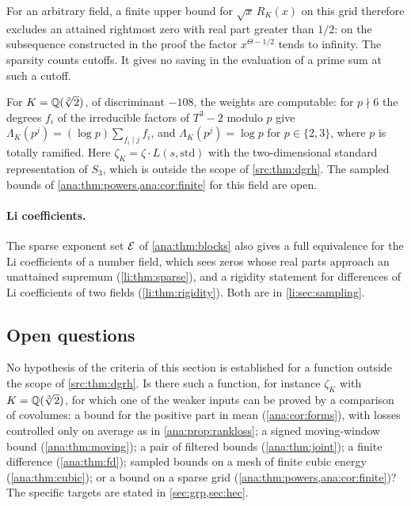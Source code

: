 For an arbitrary field, a finite upper bound for $\sqrt x\,R_K(x)$ on this grid therefore
excludes an attained rightmost zero with real part greater than $1/2$: on the subsequence
constructed in the proof the factor $x^{\Theta-1/2}$ tends to infinity. The sparsity counts
cutoffs. It gives no saving in the evaluation of a prime sum at such a cutoff.

\begin{example}\label{ana:ex:cuberoot}
For $K=\mathbb{Q}(\sqrt[3]{2})$, of discriminant $-108$, the weights are computable: for $p\nmid6$ the
degrees $f_i$ of the irreducible factors of $T^3-2$ modulo $p$ give
$\Lambda_K(p^j)=(\log p)\sum_{f_i\mid j}f_i$, and $\Lambda_K(p^j)=\log p$ for $p\in\{2,3\}$,
where $p$ is totally ramified. Here $\zeta_K=\zeta\cdot L(s,\mathrm{std})$ with the
two-dimensional standard representation of $S_3$, which is outside the scope of
\cref{src:thm:dgrh}. The sampled bounds of \cref{ana:thm:powers,ana:cor:finite} for this field
are open.
\end{example}

\paragraph{Li coefficients.}
The sparse exponent set $\mathcal{E}$ of \cref{ana:thm:blocks} also gives a full equivalence for the
Li coefficients of a number field, which sees zeros whose real parts approach an unattained
supremum (\cref{li:thm:sparse}), and a rigidity statement for differences of Li coefficients
of two fields (\cref{li:thm:rigidity}). Both are in \cref{li:sec:sampling}.

\subsection{Open questions}\label{ana:sec:open}

\begin{question}\label{ana:q:input}
No hypothesis of the criteria of this section is established for a function outside the
scope of \cref{src:thm:dgrh}. Is there such a function, for instance $\zeta_K$ with
$K=\mathbb{Q}(\sqrt[3]{2})$, for which one of the weaker inputs can be proved by a comparison of
covolumes: a bound for the positive part in mean (\cref{ana:cor:forms}), with losses
controlled only on average as in \cref{ana:prop:rankloss}; a signed moving-window bound
(\cref{ana:thm:moving}); a pair of filtered bounds (\cref{ana:thm:joint}); a finite
difference (\cref{ana:thm:fd}); sampled bounds on a mesh of finite cubic energy
(\cref{ana:thm:cubic}); or a bound on a sparse grid
(\cref{ana:thm:powers,ana:cor:finite})? The specific targets are stated in
\cref{sec:grp,sec:hec}.
\end{question}

